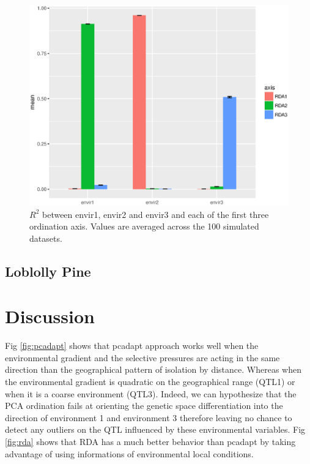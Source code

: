 \documentclass[nogrid]{MBE}%
\begin{document}
\begin{figure}[t]
\begin{center}
\includegraphics[height=0.21\textheight]{figures/R2.eps}
\end{center}
\caption{$R^2$ between envir1, envir2 and envir3 and each of the first three ordination axis. Values are averaged across the 100 simulated datasets.}%
\label{fig:R2}%
\end{figure}

\subsection{Loblolly Pine}


\section{Discussion}

Fig \ref{fig:pcadapt} shows that pcadapt approach works well when the environmental gradient and the selective pressures are acting in the same direction than the geographical pattern of isolation by distance. Whereas when the environmental gradient is quadratic on the geographical range (QTL1) or when it is a coarse environment (QTL3). Indeed, we can hypothesize that the PCA ordination fails at orienting the genetic space differentiation into the direction of environment 1 and environment 3 therefore leaving no chance to detect any outliers on the QTL influenced by these environmental variables. Fig \ref{fig:rda} shows that RDA has a much better behavior than pcadapt by taking advantage of using informations of environmental local conditions.
\end{document}
